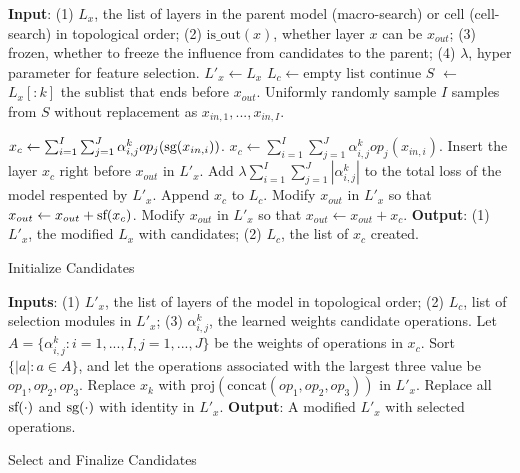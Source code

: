 
\begin{algorithm}[t]
\begin{algorithmic}[1]
\STATE \textbf{Input}: 
(1) $L_x$, the list of layers in the parent model (macro-search) or cell (cell-search) in topological order;
(2) $\text{is\_out}(x)$, whether layer $x$ can be $x_{out}$;
(3) frozen, whether to freeze the influence from candidates to the parent;
(4) $\lambda$, hyper parameter for feature selection.
\STATE $L'_x \leftarrow L_x$
\STATE $L_c \leftarrow \text{empty list}$
        \STATE continue
    \ENDIF
    \STATE $S$ $\leftarrow$ $L_x[:k]$ the sublist that ends before $x_{out}$.
    \STATE Uniformly randomly sample $I$ samples from $S$ without replacement as $x_{in,1}, ..., x_{in,I}$.

        \STATE $x_c \leftarrow \sum _{i=1}^I \sum _{j=1}^J  \alpha^k_{i,j}op_j(\textrm{sg} (x_{in,i}))$.
    \ELSE
        \STATE $x_c \leftarrow \sum _{i=1}^I \sum _{j=1}^J  \alpha^k_{i,j}op_j(x_{in,i})$.
    \ENDIF
\STATE Insert the layer $x_c$ right before $x_{out}$ in $L'_x$.
\STATE Add $\lambda \sum _{i=1}^I \sum _{j=1}^J |\alpha^k_{i,j}|$ to the total loss of the model respented by $L'_x$.
\STATE Append $x_c$ to $L_c$.
    \STATE Modify $x_{out}$ in $L'_x$ so that $x_{out} \leftarrow x_{out} + \textrm{sf} (x_c)$.
\ELSE
    \STATE Modify $x_{out}$ in $L'_x$ so that $x_{out} \leftarrow x_{out} + x_c$.
\ENDIF
\ENDFOR
\STATE \textbf{Output}: (1) $L'_x$, the modified $L_x$ with candidates; 
(2) $L_c$, the list of $x_c$ created.
\end{algorithmic}
\caption{Initialize Candidates}
\label{alg:candidate_init}
\end{algorithm}

\begin{algorithm}[t]
\begin{algorithmic}[1]
\STATE \textbf{Inputs}: (1) $L'_x$, the list of layers of the model in topological order;
(2) $L_c$, list of selection modules in $L'_x$;
(3) $\alpha^k_{i,j}$, the learned weights candidate operations. 
    \STATE Let $A = \{\alpha^{k}_{i,j}: i = 1,..., I, j = 1,..., J\}$  be the weights of operations in $x_c$.
    \STATE Sort $\{ |a| : a \in A \}$, and let the operations associated with the largest three value be $op_1, op_2, op_3$.
    \STATE Replace $x_k$ with $\text{proj}(\text{concat}(op_1, op_2, op_3))$ in $L'_x$.
\ENDFOR
\STATE Replace all $\textrm{sf} (\cdot)$ and $\textrm{sg} (\cdot)$ with identity in $L'_x$.
\STATE \textbf{Output}: A modified $L'_x$ with selected operations.
\end{algorithmic}
\caption{Select and Finalize Candidates}
\label{alg:candidate_select}
\end{algorithm}

